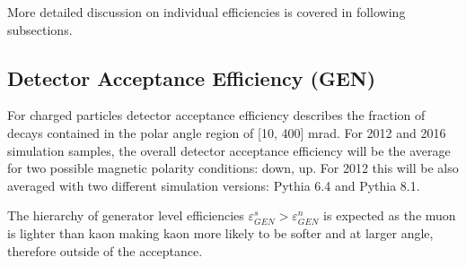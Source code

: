 More detailed discussion on individual efficiencies is covered in following subsections. 


\subsection{Detector Acceptance Efficiency (GEN)}
For charged particles detector acceptance efficiency describes the fraction of decays contained in the polar angle region of [10, 400] mrad.  
For 2012 and 2016 simulation samples, the overall detector acceptance efficiency will be the average for two possible magnetic polarity conditions: down, up. For 2012 this will be also averaged with two different simulation versions: Pythia 6.4\cite{pythia6} and Pythia 8.1\cite{pythia8}.

The hierarchy of generator level efficiencies $\varepsilon^{s}_{GEN} > \varepsilon^{n}_{GEN}$ is expected as the muon is lighter than kaon making kaon more likely to be softer and at larger angle, therefore outside of the acceptance. 

